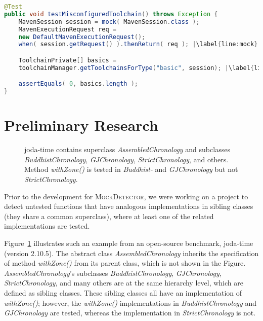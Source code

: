 \begin{lstlisting}[basicstyle=\ttfamily, caption={This code snippet illustrates an example from maven-core, where calls to both the focal method \texttt{getToolchainsForType()} and to mock \texttt{session}'s \texttt{getRequest()} method occur in test \textit{testMisconfiguredToolchain()}.},
basicstyle=\ttfamily,language = Java, framesep=4.5mm, escapechar=|,
framexleftmargin=1.0mm, captionpos=b, label=lis:mockCall, morekeywords={@Test}]
@Test
public void testMisconfiguredToolchain() throws Exception {
	MavenSession session = mock( MavenSession.class );
	MavenExecutionRequest req = 
	new DefaultMavenExecutionRequest();
	when( session.getRequest() ).thenReturn( req ); |\label{line:mock}|

	ToolchainPrivate[] basics =
	toolchainManager.getToolchainsForType("basic", session); |\label{line:real}|

	assertEquals( 0, basics.length );
}
\end{lstlisting}

\section{Preliminary Research}

\begin{figure}[h]
	\centering
	
	\caption[Caption for SiblingClass untested method.]{joda-time contains superclass \textit{AssembledChronology} and subclasses \textit{BuddhistChronology}, \textit{GJChronology}, \textit{StrictChronology}, and others. Method \textit{withZone()} is tested in \textit{Buddhist-} and \textit{GJChronology} but not \textit{StrictChronology}.\footnotemark}
	\label{fig:hierarchyView}
\end{figure}


Prior to the development for \textsc{MockDetector}, we were working on a project to detect untested functions that have analogous implementations in sibling classes (they share a common superclass), where at least one of the related implementations are tested.

Figure~\ref{fig:hierarchyView} illustrates such an example from an open-source benchmark, joda-time (version 2.10.5). The abstract class \textit{AssembledChronology} inherits the specification of method \textit{withZone()} from its parent class, which is not shown in the Figure. \textit{AssembledChronology}'s subclasses \textit{BuddhistChronology}, \textit{GJChronology}, \textit{StrictChronology}, and many others are at the same hierarchy level, which are defined as sibling classes. These sibling classes all have an implementation of \textit{withZone()}; however, the \textit{withZone()} implementations in \textit{BuddhistChronology} and \textit{GJChronology} are tested, whereas the implementation in \textit{StrictChronology} is not.

